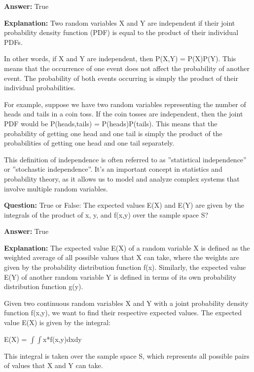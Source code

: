 \documentclass{article}
\begin{document}
                \textbf{Answer:} True

                \textbf{Explanation:} Two random variables X and Y are independent if their joint probability density function (PDF) is equal to the product of their individual PDFs.

In other words, if X and Y are independent, then P(X,Y) = P(X)P(Y). This means that the occurrence of one event does not affect the probability of another event. The probability of both events occurring is simply the product of their individual probabilities.

For example, suppose we have two random variables representing the number of heads and tails in a coin toss. If the coin tosses are independent, then the joint PDF would be P(heads,tails) = P(heads)P(tails). This means that the probability of getting one head and one tail is simply the product of the probabilities of getting one head and one tail separately.

This definition of independence is often referred to as ''statistical independence'' or ''stochastic independence''. It's an important concept in statistics and probability theory, as it allows us to model and analyze complex systems that involve multiple random variables.
                
                \vspace{0.5cm} 
        
            
                \textbf {Question:} True or False: The expected values E(X) and E(Y) are given by the integrals of the product of x, y, and f(x,y) over the sample space S?
                
                \textbf{Answer:} True

                \textbf{Explanation:} The expected value E(X) of a random variable X is defined as the weighted average of all possible values that X can take, where the weights are given by the probability distribution function f(x). Similarly, the expected value E(Y) of another random variable Y is defined in terms of its own probability distribution function g(y).

Given two continuous random variables X and Y with a joint probability density function f(x,y), we want to find their respective expected values. The expected value E(X) is given by the integral:

E(X) = \ensuremath{\int}\ensuremath{\int}x*f(x,y)dxdy

This integral is taken over the sample space S, which represents all possible pairs of values that X and Y can take.
\end{document}
